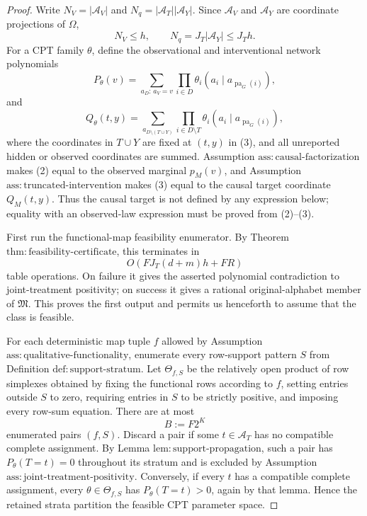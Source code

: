 \documentclass{article}
\begin{document}
\begin{proof}
Write \(N_V=|\mathcal A_V|\) and \(N_q=|\mathcal A_T||\mathcal A_Y|\). Since \(\mathcal A_V\) and \(\mathcal A_Y\) are coordinate projections of \(\Omega\),
\[
 N_V\le h,
 \qquad
 N_q=J_T|\mathcal A_Y|\le J_Th.
 \tag{1}
\]
For a CPT family \(\theta\), define the observational and interventional network polynomials
\[
 P_\theta(v)
 =\sum_{a_D:\,a_V=v}\prod_{i\in D}
   \theta_i(a_i\mid a_{\operatorname{pa}_G(i)}),
 \tag{2}
\]
and
\[
 Q_\theta(t,y)
 =\sum_{a_{D\setminus(T\cup Y)}}
   \prod_{i\in D\setminus T}
   \theta_i(a_i\mid a_{\operatorname{pa}_G(i)}),
 \tag{3}
\]
where the coordinates in \(T\cup Y\) are fixed at \((t,y)\) in (3), and all unreported hidden or observed coordinates are summed. Assumption \(\mathrm{ass:causal\text{-}factorization}\) makes (2) equal to the observed marginal \(p_M(v)\), and Assumption \(\mathrm{ass:truncated\text{-}intervention}\) makes (3) equal to the causal target coordinate \(Q_M(t,y)\). Thus the causal target is not defined by any expression below; equality with an observed-law expression must be proved from (2)--(3).

First run the functional-map feasibility enumerator. By Theorem \(\mathrm{thm:feasibility\text{-}certificate}\), this terminates in
\[
 O\!\left(FJ_T(d+m)h+FR\right)
 \tag{4}
\]
table operations. On failure it gives the asserted polynomial contradiction to joint-treatment positivity; on success it gives a rational original-alphabet member of \(\mathfrak M\). This proves the first output and permits us henceforth to assume that the class is feasible.

For each deterministic map tuple \(f\) allowed by Assumption \(\mathrm{ass:qualitative\text{-}functionality}\), enumerate every row-support pattern \(S\) from Definition \(\mathrm{def:support\text{-}stratum}\). Let \(\Theta_{f,S}\) be the relatively open product of row simplexes obtained by fixing the functional rows according to \(f\), setting entries outside \(S\) to zero, requiring entries in \(S\) to be strictly positive, and imposing every row-sum equation. There are at most
\[
 B:=F2^K
 \tag{5}
\]
enumerated pairs \((f,S)\). Discard a pair if some \(t\in\mathcal A_T\) has no compatible complete assignment. By Lemma \(\mathrm{lem:support\text{-}propagation}\), such a pair has \(P_\theta(T=t)=0\) throughout its stratum and is excluded by Assumption \(\mathrm{ass:joint\text{-}treatment\text{-}positivity}\). Conversely, if every \(t\) has a compatible complete assignment, every \(\theta\in\Theta_{f,S}\) has \(P_\theta(T=t)>0\), again by that lemma. Hence the retained strata partition the feasible CPT parameter space.


\end{proof}
\end{document}
